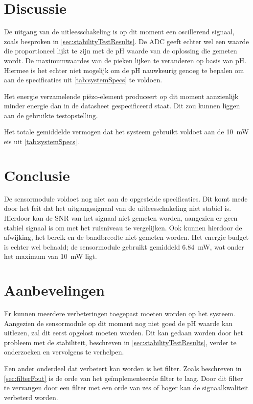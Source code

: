\section{Discussie}
%


De uitgang van de uitleesschakeling is op dit moment een oscillerend signaal, zoals besproken in \cref{sec:stabilityTestResults}. De ADC geeft echter wel een waarde die proportioneel lijkt te zijn met de pH waarde van de oplossing die gemeten wordt.
De maximumwaardes van de pieken lijken te veranderen op basis van pH. Hiermee is het echter niet mogelijk om de pH nauwkeurig genoeg te bepalen om aan de specificaties uit \cref{tab:systemSpecs} te voldoen.

Het energie verzamelende piëzo-element produceert op dit moment aanzienlijk minder energie dan in de datasheet gespecificeerd staat. Dit zou kunnen liggen aan de gebruikte testopstelling.

Het totale gemiddelde vermogen dat het systeem gebruikt voldoet aan de \qty{10}{\milli\watt} eis uit \cref{tab:systemSpecs}.

\newpage
\section{Conclusie}
De sensormodule voldoet nog niet aan de opgestelde specificaties. Dit komt mede door het feit dat het uitgangssignaal van de uitleesschakeling niet stabiel is. Hierdoor kan de SNR van het signaal niet gemeten worden, aangezien er geen stabiel signaal is om met het ruisniveau te vergelijken. Ook kunnen hierdoor de afwijking, het bereik en de bandbreedte niet gemeten worden.
Het energie budget is echter wel behaald; de sensormodule gebruikt gemiddeld \qty{6.84}{\milli\watt}, wat onder het maximum van \qty{10}{\milli\watt} ligt.




\newpage
\section{Aanbevelingen}
Er kunnen meerdere verbeteringen toegepast moeten worden op het systeem. Aangezien de sensormodule op dit moment nog niet goed de pH waarde kan uitlezen, zal dit eerst opgelost moeten worden. Dit kan gedaan worden door het probleem met de stabiliteit, beschreven in \cref{sec:stabilityTestResults}, verder te onderzoeken en vervolgens te verhelpen.

Een ander onderdeel dat verbetert kan worden is het filter. Zoals beschreven in \cref{sec:filterFout} is de orde van het geïmplementeerde filter te laag. Door dit filter te vervangen door een filter met een orde van zes of hoger kan de signaalkwaliteit verbeterd worden.


